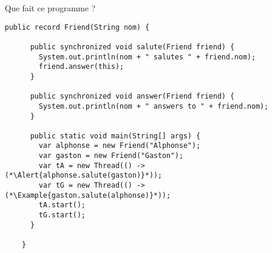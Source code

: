 
\begingroup

\begin{frame}[fragile]{Que fait ce programme ?}

  \begin{lstlisting}[gobble=2]
    public record Friend(String nom) {
      
      public synchronized void salute(Friend friend) {
        System.out.println(nom + " salutes " + friend.nom);
        friend.answer(this);
      }
      
      public synchronized void answer(Friend friend) {
        System.out.println(nom + " answers to " + friend.nom);
      }
      
      public static void main(String[] args) {
        var alphonse = new Friend("Alphonse");
        var gaston = new Friend("Gaston");
        var tA = new Thread(() -> (*\Alert{alphonse.salute(gaston)}*));
        var tG = new Thread(() -> (*\Example{gaston.salute(alphonse)}*));
        tA.start();
        tG.start();
      }
      
    }
  \end{lstlisting}

  
\end{frame}

\endgroup
\endinput
